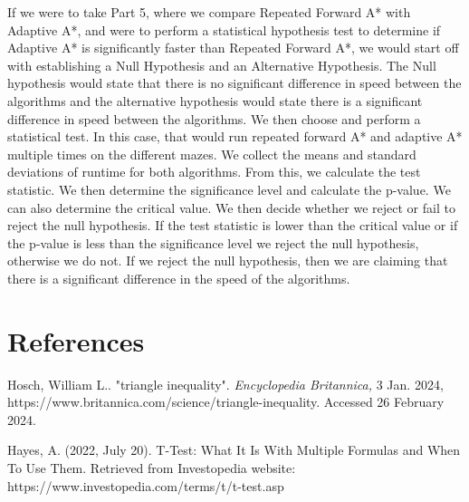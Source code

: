 \documentclass[10pt]{article}
\begin{document}
If we were to take Part 5, where we compare Repeated Forward A* with Adaptive A*, and were to perform a statistical hypothesis test to determine if Adaptive A* is significantly faster than Repeated Forward A*, we would start off with establishing a Null Hypothesis and an Alternative Hypothesis. The Null hypothesis would state that there is no significant difference in speed between the algorithms and the alternative hypothesis would state there is a significant difference in speed between the algorithms. We then choose and perform a statistical test. In this case, that would run repeated forward A* and adaptive A* multiple times on the different mazes. We collect the means and standard deviations of runtime for both algorithms. From this, we calculate the test statistic. We then determine the significance level and calculate the p-value. We can also determine the critical value. We then decide whether we reject or fail to reject the null hypothesis. If the test statistic is lower than the critical value or if the p-value is less than the significance level we reject the null hypothesis, otherwise we do not. If we reject the null hypothesis, then we are claiming that there is a significant difference in the speed of the algorithms.

\section*{References}

Hosch, William L.. "triangle inequality". \textit{Encyclopedia Britannica,} 3 Jan. 2024, https://www.britannica.com/science/triangle-inequality. Accessed 26 February 2024.\newline


\noindent Hayes, A. (2022, July 20). T-Test: What It Is With Multiple Formulas and When To Use Them. Retrieved from Investopedia website: https://www.investopedia.com/terms/t/t-test.asp

 
\end{document}
